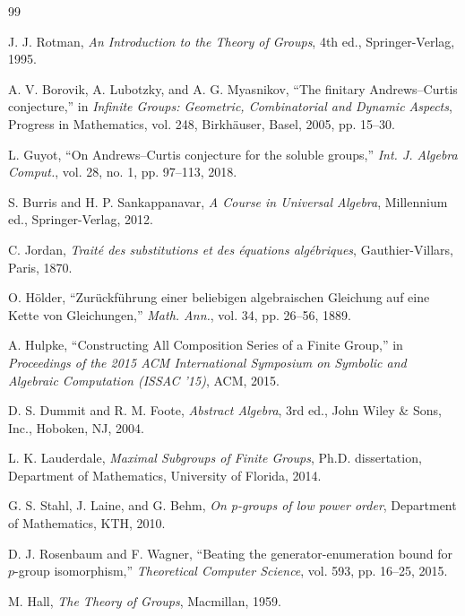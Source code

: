 \documentclass[11pt,a4paper]{article}
\theoremstyle{definition}
\begin{document}
\begin{thebibliography}{99}

J. J. Rotman, \emph{An Introduction to the Theory of Groups}, 4th ed., Springer-Verlag, 1995.

A. V. Borovik, A. Lubotzky, and A. G. Myasnikov, ``The finitary Andrews--Curtis conjecture,'' in \emph{Infinite Groups: Geometric, Combinatorial and Dynamic Aspects}, Progress in Mathematics, vol. 248, Birkhäuser, Basel, 2005, pp. 15--30.

L. Guyot, ``On Andrews--Curtis conjecture for the soluble groups,'' \emph{Int. J. Algebra Comput.}, vol. 28, no. 1, pp. 97--113, 2018.

S. Burris and H. P. Sankappanavar, \emph{A Course in Universal Algebra}, Millennium ed., Springer-Verlag, 2012.

C. Jordan, \emph{Traité des substitutions et des équations algébriques}, Gauthier-Villars, Paris, 1870.

O. Hölder, ``Zurückführung einer beliebigen algebraischen Gleichung auf eine Kette von Gleichungen,'' \emph{Math. Ann.}, vol. 34, pp. 26--56, 1889.

A. Hulpke, ``Constructing All Composition Series of a Finite Group,'' in \emph{Proceedings of the 2015 ACM International Symposium on Symbolic and Algebraic Computation (ISSAC '15)}, ACM, 2015.

D. S. Dummit and R. M. Foote, \emph{Abstract Algebra}, 3rd ed., John Wiley \& Sons, Inc., Hoboken, NJ, 2004.

L. K. Lauderdale, \emph{Maximal Subgroups of Finite Groups}, Ph.D. dissertation, Department of Mathematics, University of Florida, 2014.

G. S. Stahl, J. Laine, and G. Behm, \emph{On p-groups of low power order}, Department of Mathematics, KTH, 2010.

D. J. Rosenbaum and F. Wagner, ``Beating the generator-enumeration bound for $p$-group isomorphism,'' \emph{Theoretical Computer Science}, vol. 593, pp. 16--25, 2015.

M. Hall, \emph{The Theory of Groups}, Macmillan, 1959.

\end{thebibliography}
\end{document}
